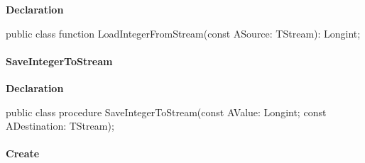\documentclass{report}
\newif\ifpdf
\begin{document}
\label{PasDoc_Serialize.TSerializable-LoadIntegerFromStream}
\begin{list}{}{
\setlength{\itemindent}{0cm}
\setlength{\listparindent}{0cm}
\setlength{\leftmargin}{\evensidemargin}
\addtolength{\leftmargin}{\tmplength}
\settowidth{\labelsep}{X}
\addtolength{\leftmargin}{\labelsep}
\setlength{\labelwidth}{\tmplength}
}
\item[\textbf{Declaration}\hfill]
\ifpdf
\begin{flushleft}
\fi
\begin{ttfamily}
public class function LoadIntegerFromStream(const ASource: TStream): Longint;\end{ttfamily}

\ifpdf
\end{flushleft}
\fi

\end{list}
\paragraph*{SaveIntegerToStream}\hspace*{\fill}

\label{PasDoc_Serialize.TSerializable-SaveIntegerToStream}
\begin{list}{}{
\setlength{\itemindent}{0cm}
\setlength{\listparindent}{0cm}
\setlength{\leftmargin}{\evensidemargin}
\addtolength{\leftmargin}{\tmplength}
\settowidth{\labelsep}{X}
\addtolength{\leftmargin}{\labelsep}
\setlength{\labelwidth}{\tmplength}
}
\item[\textbf{Declaration}\hfill]
\ifpdf
\begin{flushleft}
\fi
\begin{ttfamily}
public class procedure SaveIntegerToStream(const AValue: Longint; const ADestination: TStream);\end{ttfamily}

\ifpdf
\end{flushleft}
\fi

\end{list}
\paragraph*{Create}\hspace*{\fill}
\end{document}
